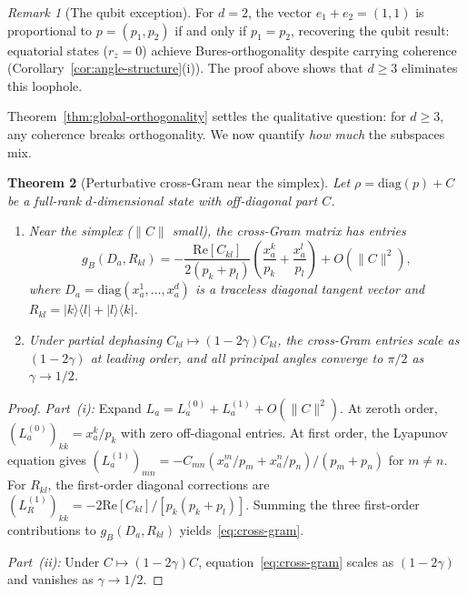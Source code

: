 \documentclass[12pt,a4paper]{article}
\newtheorem{theorem}{Theorem}[section]
\theoremstyle{definition}
\theoremstyle{remark}
\newtheorem{remark}[theorem]{Remark}
\begin{document}
\begin{remark}[The qubit exception]
\label{rem:qubit-exception}
For $d = 2$, the vector $e_1 + e_2 = (1,1)$ is proportional to $p = (p_1, p_2)$ if and only if $p_1 = p_2$, recovering the qubit result: equatorial states ($r_z = 0$) achieve Bures-orthogonality despite carrying coherence (Corollary~\ref{cor:angle-structure}(i)). The proof above shows that $d \geq 3$ eliminates this loophole.
\end{remark}

Theorem~\ref{thm:global-orthogonality} settles the qualitative question: for $d \geq 3$, any coherence breaks orthogonality. We now quantify \emph{how much} the subspaces mix.

\begin{theorem}[Perturbative cross-Gram near the simplex]
\label{thm:qudit-angles}
Let $\rho = \mathrm{diag}(p) + C$ be a full-rank $d$-dimensional state with off-diagonal part $C$.
\begin{enumerate}
\item[\emph{(i)}] Near the simplex ($\|C\|$ small), the cross-Gram matrix has entries
\begin{equation}
\label{eq:cross-gram}
g_B(D_a, R_{kl}) = -\frac{\mathrm{Re}[C_{kl}]}{2(p_k + p_l)}\!\left(\frac{x_a^k}{p_k} + \frac{x_a^l}{p_l}\right) + O(\|C\|^2),
\end{equation}
where $D_a = \mathrm{diag}(x_a^1, \ldots, x_a^d)$ is a traceless diagonal tangent vector and $R_{kl} = |k\rangle\langle l| + |l\rangle\langle k|$.
\item[\emph{(ii)}] Under partial dephasing $C_{kl} \mapsto (1{-}2\gamma) C_{kl}$, the cross-Gram entries scale as $(1{-}2\gamma)$ at leading order, and all principal angles converge to $\pi/2$ as $\gamma \to 1/2$.
\end{enumerate}
\end{theorem}

\begin{proof}
\emph{Part~(i):} Expand $L_a = L_a^{(0)} + L_a^{(1)} + O(\|C\|^2)$. At zeroth order, $(L_a^{(0)})_{kk} = x_a^k/p_k$ with zero off-diagonal entries. At first order, the Lyapunov equation gives $(L_a^{(1)})_{mn} = -C_{mn}(x_a^m/p_m + x_a^n/p_n)/(p_m + p_n)$ for $m \neq n$. For $R_{kl}$, the first-order diagonal corrections are $(L_R^{(1)})_{kk} = -2\mathrm{Re}[C_{kl}]/[p_k(p_k + p_l)]$. Summing the three first-order contributions to $g_B(D_a, R_{kl})$ yields~\eqref{eq:cross-gram}.

\emph{Part~(ii):} Under $C \mapsto (1{-}2\gamma)C$, equation~\eqref{eq:cross-gram} scales as $(1{-}2\gamma)$ and vanishes as $\gamma \to 1/2$.
\end{proof}
\end{document}
